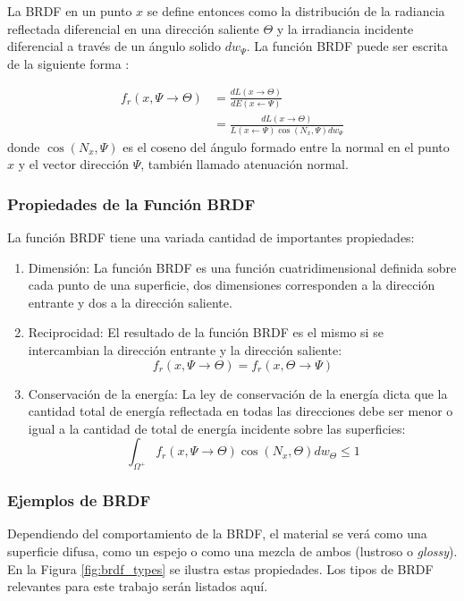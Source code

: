 La \ac{BRDF} en un punto $x$ se define entonces como la distribución de la radiancia reflectada diferencial en una dirección saliente $\Theta$ y la irradiancia incidente diferencial a través de un ángulo solido $dw_{\Psi}$. La función \ac{BRDF} puede ser escrita de la siguiente forma \cite{advanced_gi2006}:

\begin{equation}
	\begin{split}
        f_{r}(x, \Psi\to\Theta) &= \frac{dL(x\to\Theta)}{dE(x\gets\Psi)}\\
        &= \frac{dL(x\to\Theta)}{L(x\gets\Psi)\cos(N_{x}, \Psi)dw_{\Psi}}
	\end{split}
	\label{eq:brdf_def}
\end{equation} donde $\cos(N_{x}, \Psi)$ es el coseno del ángulo formado entre la normal en el punto $x$ y el vector dirección $\Psi$, también llamado atenuación normal.

\subsubsection{Propiedades de la Función BRDF}

La función BRDF tiene una variada cantidad de importantes propiedades:

\begin{enumerate}
	\item Dimensión: La función BRDF es una función cuatridimensional definida sobre cada punto de una superficie, dos dimensiones corresponden a la dirección entrante y dos a la dirección saliente.
	\item Reciprocidad: El resultado de la función BRDF es el mismo si se intercambian la dirección entrante y la dirección saliente:
    	\begin{equation}
            f_{r}(x, \Psi\to\Theta) = f_{r}(x, \Theta\to\Psi)
    	\end{equation}
	\item Conservación de la energía: La ley de conservación de la energía dicta que la cantidad total de energía reflectada en todas las direcciones debe ser menor o igual a la cantidad de total de energía incidente sobre las superficies: 
    	\begin{equation}
    		\int_{\Omega^{+}}f_{r}(x, \Psi\to\Theta)\cos(N_{x}, \Theta)dw_{\Theta} \leq 1
    	\end{equation}
\end{enumerate}

\subsubsection{Ejemplos de BRDF}
Dependiendo del comportamiento de la \ac{BRDF}, el material se verá como una superficie difusa, como un espejo o como una mezcla de ambos (lustroso o \emph{glossy}). En la Figura \ref{fig:brdf_types} se ilustra estas propiedades. Los tipos de BRDF relevantes para este trabajo serán listados aquí.

